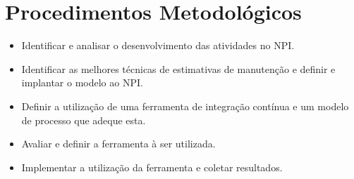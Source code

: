 \chapter{Procedimentos Metodológicos}\label{metodologia}

\begin{itemize}
\item Identificar e analisar o desenvolvimento das atividades no NPI.
\item Identificar as melhores técnicas de estimativas de manutenção e definir e implantar o modelo ao NPI.
\item Definir a utilização de uma ferramenta de integração contínua e um modelo de processo que adeque esta.
\item Avaliar e definir a ferramenta à ser utilizada.
\item Implementar a utilização da ferramenta e coletar resultados.
\end{itemize}